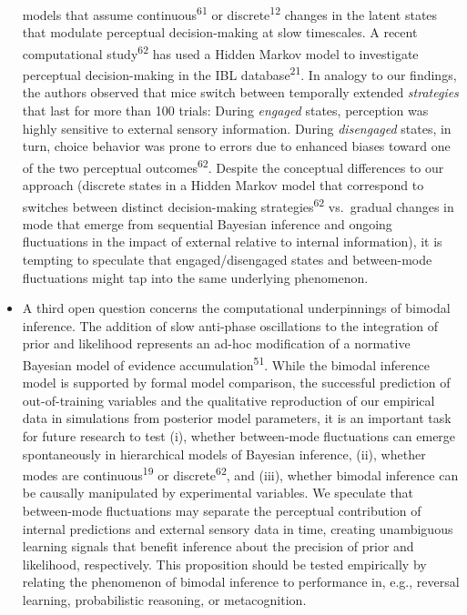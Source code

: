 \documentclass[
]{article}
\begin{document}
\begin{itemize}
  models that assume continuous\textsuperscript{61} or
  discrete\textsuperscript{12} changes in the latent states that
  modulate perceptual decision-making at slow timescales. A recent
  computational study\textsuperscript{62} has used a Hidden Markov model
  to investigate perceptual decision-making in the IBL
  database\textsuperscript{21}. In analogy to our findings, the authors
  observed that mice switch between temporally extended
  \emph{strategies} that last for more than 100 trials: During
  \emph{engaged} states, perception was highly sensitive to external
  sensory information. During \emph{disengaged} states, in turn, choice
  behavior was prone to errors due to enhanced biases toward one of the
  two perceptual outcomes\textsuperscript{62}. Despite the conceptual
  differences to our approach (discrete states in a Hidden Markov model
  that correspond to switches between distinct decision-making
  strategies\textsuperscript{62} vs.~gradual changes in mode that emerge
  from sequential Bayesian inference and ongoing fluctuations in the
  impact of external relative to internal information), it is tempting
  to speculate that engaged/disengaged states and between-mode
  fluctuations might tap into the same underlying phenomenon.
\item
  A third open question concerns the computational underpinnings of
  bimodal inference. The addition of slow anti-phase oscillations to the
  integration of prior and likelihood represents an ad-hoc modification
  of a normative Bayesian model of evidence
  accumulation\textsuperscript{51}. While the bimodal inference model is
  supported by formal model comparison, the successful prediction of
  out-of-training variables and the qualitative reproduction of our
  empirical data in simulations from posterior model parameters, it is
  an important task for future research to test (i), whether
  between-mode fluctuations can emerge spontaneously in hierarchical
  models of Bayesian inference, (ii), whether modes are
  continuous\textsuperscript{19} or discrete\textsuperscript{62}, and
  (iii), whether bimodal inference can be causally manipulated by
  experimental variables. We speculate that between-mode fluctuations
  may separate the perceptual contribution of internal predictions and
  external sensory data in time, creating unambiguous learning signals
  that benefit inference about the precision of prior and likelihood,
  respectively. This proposition should be tested empirically by
  relating the phenomenon of bimodal inference to performance in, e.g.,
  reversal learning, probabilistic reasoning, or metacognition.
\end{itemize}
\end{document}
